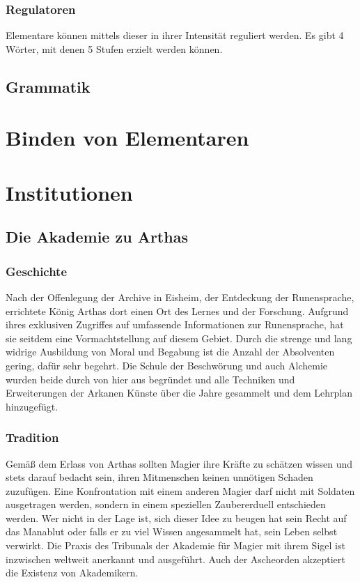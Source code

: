 \documentclass[a4paper,12pt,oneside]{book}
\begin{document}
\section{Regulatoren}
Elementare können mittels dieser in ihrer Intensität reguliert werden. Es gibt 4 Wörter, mit denen 5 Stufen erzielt werden können.

\chapter{Grammatik}

\part{Binden von Elementaren}

\part{Institutionen}

\chapter{Die Akademie zu Arthas}

\section{Geschichte}
Nach der Offenlegung der Archive in Eisheim, der Entdeckung der Runensprache, errichtete König Arthas dort einen Ort des Lernes und der Forschung. Aufgrund ihres exklusiven Zugriffes auf umfassende Informationen zur Runensprache, hat sie seitdem eine Vormachtstellung auf diesem Gebiet. Durch die strenge und lang widrige Ausbildung von Moral und Begabung ist die Anzahl der Absolventen gering, dafür sehr begehrt. Die Schule der Beschwörung und auch Alchemie wurden beide durch von hier aus begründet und alle Techniken und Erweiterungen der Arkanen Künste über die Jahre gesammelt und dem Lehrplan hinzugefügt.

\section{Tradition}
Gemäß dem Erlass von Arthas sollten Magier ihre Kräfte zu schätzen wissen und stets darauf bedacht sein, ihren Mitmenschen keinen unnötigen Schaden zuzufügen. Eine Konfrontation mit einem anderen Magier darf nicht mit Soldaten ausgetragen werden, sondern in einem speziellen Zaubererduell entschieden werden. Wer nicht in der Lage ist, sich dieser Idee zu beugen hat sein Recht auf das Manablut oder falls er zu viel Wissen angesammelt hat, sein Leben selbst verwirkt. Die Praxis des Tribunals der Akademie für Magier mit ihrem Sigel ist inzwischen weltweit anerkannt und ausgeführt. Auch der Ascheorden akzeptiert die Existenz von Akademikern.
\end{document}
